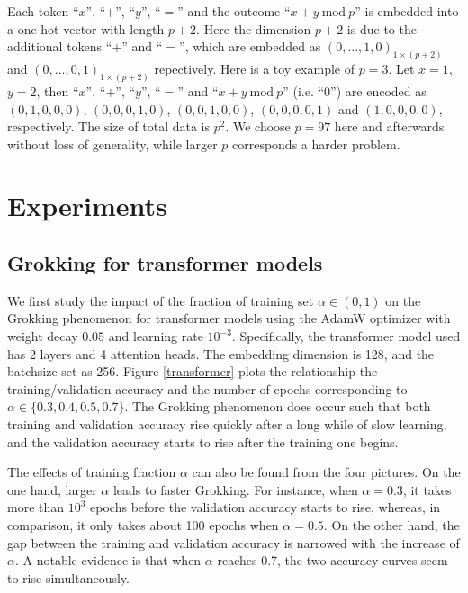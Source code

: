 \documentclass[UTF8]{article}
\begin{document}
Each token ``$x$'', ``$+$'', ``$y$'', ``$=$'' and the outcome ``$x+y~ \mathrm{mod} ~ p$'' is embedded into a one-hot vector with length $p+2$. Here the dimension $p+2$ is due to the additional tokens ``$+$'' and ``$=$'', which are embedded as $(0,\ldots,1,0)_{1\times (p+2)}$ and $(0,\ldots,0,1)_{1\times (p+2)}$ repectively. Here is a toy example of $p=3$. Let $x=1$, $y=2$, then ``$x$'', ``$+$'', ``$y$'', ``$=$'' and ``$x+y~ \mathrm{mod} ~ p $'' (i.e. ``$0$'') are encoded as $(0,1,0,0,0)$, $(0,0,0,1,0)$, $(0,0,1,0,0)$, $(0,0,0,0,1)$ and $(1,0,0,0,0)$, respectively. The size of total data is $p^2$. We choose $p=97$ here and afterwards without loss of generality, while larger $p$ corresponds a harder problem.

\section{Experiments}

\subsection{Grokking for transformer models}\label{section_transformer}

We first study the impact of the fraction of training set $\alpha \in (0,1)$ on
the Grokking phenomenon for transformer models using the AdamW optimizer
with weight decay $0.05$ and learning rate $10^{-3}$.
Specifically, the transformer model used has  2 layers and 4 attention heads.
The embedding dimension is 128, and the batchsize set as 256.
Figure \ref{transformer} plots the relationship the
training/validation accuracy and the number of epochs corresponding to $\alpha
\in \{0.3,0.4,0.5,0.7\}$. The Grokking phenomenon does occur such that both
training and validation accuracy rise quickly after a long while of slow
learning, and the validation accuracy starts to rise after the training one
begins.

The effects of training fraction $\alpha$ can also be found from the
four pictures. On the one hand, larger $\alpha$ leads to faster Grokking. For
instance, when $\alpha=0.3$, it takes more than $10^3$ epochs before the
validation accuracy starts to rise, whereas, in comparison, it only takes about
100 epochs when
$\alpha=0.5$. On the other hand, the gap between the training and validation accuracy is narrowed with the increase of $\alpha$. A notable evidence is that when $\alpha$ reaches 0.7, the two accuracy curves seem to rise simultaneously.
\end{document}
